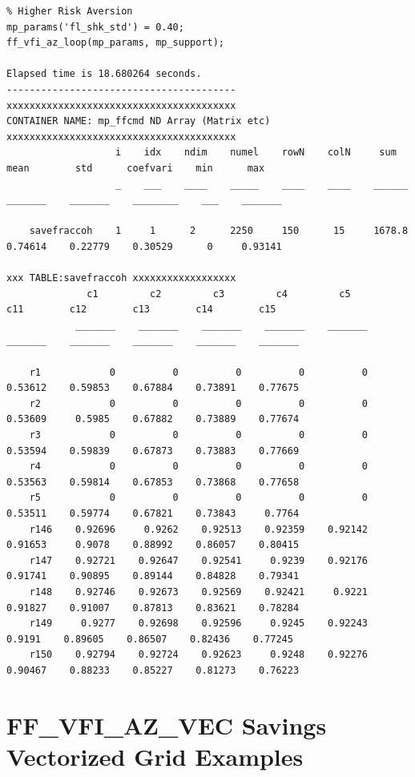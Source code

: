 \documentclass[
]{book}
\begin{document}
\begin{verbatim}
% Higher Risk Aversion
mp_params('fl_shk_std') = 0.40;
ff_vfi_az_loop(mp_params, mp_support);

Elapsed time is 18.680264 seconds.
----------------------------------------
xxxxxxxxxxxxxxxxxxxxxxxxxxxxxxxxxxxxxxxx
CONTAINER NAME: mp_ffcmd ND Array (Matrix etc)
xxxxxxxxxxxxxxxxxxxxxxxxxxxxxxxxxxxxxxxx
                   i    idx    ndim    numel    rowN    colN     sum       mean        std      coefvari    min      max  
                   _    ___    ____    _____    ____    ____    ______    _______    _______    ________    ___    _______

    savefraccoh    1     1      2      2250     150      15     1678.8    0.74614    0.22779    0.30529      0     0.93141

xxx TABLE:savefraccoh xxxxxxxxxxxxxxxxxx
              c1         c2         c3         c4         c5         c11        c12        c13        c14        c15  
            _______    _______    _______    _______    _______    _______    _______    _______    _______    _______

    r1            0          0          0          0          0    0.53612    0.59853    0.67884    0.73891    0.77675
    r2            0          0          0          0          0    0.53609     0.5985    0.67882    0.73889    0.77674
    r3            0          0          0          0          0    0.53594    0.59839    0.67873    0.73883    0.77669
    r4            0          0          0          0          0    0.53563    0.59814    0.67853    0.73868    0.77658
    r5            0          0          0          0          0    0.53511    0.59774    0.67821    0.73843     0.7764
    r146    0.92696     0.9262    0.92513    0.92359    0.92142    0.91653     0.9078    0.88992    0.86057    0.80415
    r147    0.92721    0.92647    0.92541     0.9239    0.92176    0.91741    0.90895    0.89144    0.84828    0.79341
    r148    0.92746    0.92673    0.92569    0.92421     0.9221    0.91827    0.91007    0.87813    0.83621    0.78284
    r149     0.9277    0.92698    0.92596     0.9245    0.92243     0.9191    0.89605    0.86507    0.82436    0.77245
    r150    0.92794    0.92724    0.92623     0.9248    0.92276    0.90467    0.88233    0.85227    0.81273    0.76223
\end{verbatim}

\hypertarget{ff_vfi_az_vec-savings-vectorized-grid-examples}{%
\section{FF\_VFI\_AZ\_VEC Savings Vectorized Grid Examples}\label{ff_vfi_az_vec-savings-vectorized-grid-examples}}
\end{document}
